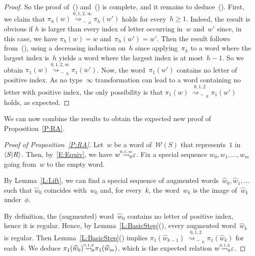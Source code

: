 \documentclass{amsart}
\numberwithin{equation}{section}
\theoremstyle{plain}
\theoremstyle{definition}
\let\ge=\geqslant
\newcounter{ITEM}
\begin{document}
\begin{proof}
So the proof of~{\setcounter{ITEM}{1}\leavevmode\hbox{\rm()}} and~{\setcounter{ITEM}{2}\leavevmode\hbox{\rm()}} is complete, and it remains to deduce~{\setcounter{ITEM}{3}\leavevmode\hbox{\rm()}}. First, we claim that $\pi_{h}({w}) {\mathrel{\overset{0,1,2,\infty}{\ \rightsquigarrow_{\!\!\!\!\!\!-\,{{\!{}_{R}}}}}}} \pi_{h}({w}')$ holds for every~${h} \ge 1$. Indeed, the result is obvious if ${h}$ is larger than every index of letter occurring in~${w}$ and~${w}'$ since, in this case, we have $\pi_{h}({w}) = {w}$ and~$\pi_{h}({w}') = {w}'$. Then the result follows from~{\setcounter{ITEM}{2}\leavevmode\hbox{\rm()}}, using a decreasing induction on~${h}$ since applying~$\pi_{h}$ to a word where the largest index is~${h}$ yields a word where the largest index is at most~${h}-1$. So we obtain $\pi_1({w}) {\mathrel{\overset{0,1,2,\infty}{\ \rightsquigarrow_{\!\!\!\!\!\!-\,{{\!{}_{R}}}}}}} \pi_1({w}')$. Now, the word~$\pi_1({w}')$ contains no letter of positive index. As no type~$\infty$ transformation can lead to a word containing no letter with positive index, the only possibility is that $\pi_1({w}){\mathrel{\overset{0,1,2}{\ \rightsquigarrow_{\!\!\!\!\!\!-\,{{\!{}_{R}}}}}}} \pi_1({w}')$ holds, as expected. 
\end{proof}

We can now combine the results to obtain the expected new proof of Proposition~\ref{P:RA}.

\begin{proof}[Proof of Proposition~\ref{P:RA}]
Let~${w}$ be a word of~${\mathcal{W}({S})}$ that represents~$1$ in~${\langle{S}{\mid}\nobreak{R}\rangle}$. Then, by~\eqref{E:Equiv}, we have ${w} {\mathrel{{\mathrel{\overset{\scriptscriptstyle 0,1,\infty}{\rightsquigarrow}}}_{\hspace{-1.2ex}{\scriptscriptstyle R}}}} {\varepsilon}$. Fix a special sequence ${w}_0, {w}_1, ..., {w}_{m}$ going from~${w}$ to the empty word.

By Lemma~\ref{L:Lift}, we can find a special sequence of augmented words~${\widehat{w}}_0, {\widehat{w}}_1, ...$ such that ${\widehat{w}}_0$ coincides with~${w}_0$ and, for every~${k}$, the word~${w}_{k}$ is the image of~${\widehat{w}}_{k}$ under~$\phi$.

By definition, the (augmented) word~${\widehat{w}}_0$ contains no letter of positive index, hence it is regular. Hence, by Lemma~\ref{L:BasicStep}{\setcounter{ITEM}{1}\leavevmode\hbox{\rm()}}, every augmented word~${\widehat{w}}_{k}$ is regular. 
Then Lemma~\ref{L:BasicStep}{\setcounter{ITEM}{3}\leavevmode\hbox{\rm()}} implies $\pi_1({\widehat{w}}_{{k}-1}) {\mathrel{\overset{0,1,2}{\ \rightsquigarrow_{\!\!\!\!\!\!-\,{{\!{}_{R}}}}}}} \pi_1({\widehat{w}}_{k})$ for each~${k}$. We deduce $\pi_1({\widehat{w}}_0) {\mathrel{{\mathrel{\overset{\scriptscriptstyle 0,1,2}{\rightsquigarrow}}}_{\hspace{-0.9ex}{\scriptscriptstyle R}}}} \pi_1({\widehat{w}}_{m})$, which is the expected relation ${w} {\mathrel{{\mathrel{\overset{\scriptscriptstyle 0,1,2}{\rightsquigarrow}}}_{\hspace{-0.9ex}{\scriptscriptstyle R}}}} {\varepsilon}$.
\end{proof}
\end{document}
